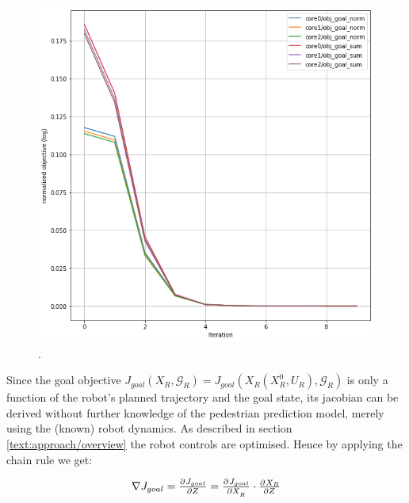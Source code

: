\begin{figure}[!ht]
\begin{center}
\includegraphics[width=\imgwidth]{images/goal_norm_vs_sum.png}
.
\label{img:goal_norm_vs_sum}
\end{center}
\end{figure}

Since the goal objective $J_{goal}(X_R, \mathcal{G}_R) = J_{goal}(X_R(X_R^0, U_R), \mathcal{G}_R)$ is only a function of the robot's planned trajectory and the goal state, its jacobian can be derived without further knowledge of the pedestrian prediction model, merely using the (known) robot dynamics. As described in section \ref{text:approach/overview} the robot controls are optimised. Hence by applying the chain rule we get: 

\begin{equation}
\nabla J_{goal} = \pd{J_{goal}}{Z} = \pd{J_{goal}}{X_R} \cdot \pd{X_R}{Z}
\end{equation}

